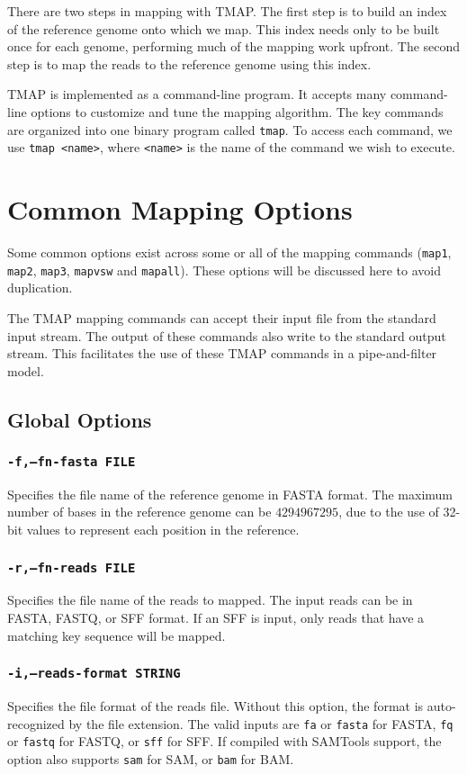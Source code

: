 \documentclass[a4paper,12pt]{book}
\newcommand{\TT}[1]{{\tt #1}} %
\begin{document}
There are two steps in mapping with TMAP.
The first step is to build an index of the reference genome onto which we map.
This index needs only to be built once for each genome, performing much of the mapping work upfront.
The second step is to map the reads to the reference genome using this index.

TMAP is implemented as a command-line program.
It accepts many command-line options to customize and tune the mapping algorithm.
The key commands are organized into one binary program called \TT{tmap}.
To access each command, we use \TT{tmap <name>}, where \TT{<name>} is the name of the command we wish to execute.

\section{Common Mapping Options}
\label{sec:commonoptions}
Some common options exist across some or all of the mapping commands (\TT{map1}, \TT{map2}, \TT{map3}, \TT{mapvsw} and \TT{mapall}). 
These options will be discussed here to avoid duplication.

The TMAP mapping commands can accept their input file from the standard input stream.
The output of these commands also write to the standard output stream.
This facilitates the use of these TMAP commands in a pipe-and-filter model.

\subsection{Global Options}
\subsubsection{\TT{-f,--fn-fasta FILE}}
Specifies the file name of the reference genome in FASTA format.
The maximum number of bases in the reference genome can be $4294967295$, due to the use of 32-bit values to represent each position in the reference.

\subsubsection{\TT{-r,--fn-reads FILE}}
Specifies the file name of the reads to mapped.
The input reads can be in FASTA, FASTQ, or SFF format.
If an SFF is input, only reads that have a matching key sequence will be mapped.

\subsubsection{\TT{-i,--reads-format STRING}}
Specifies the file format of the reads file.
Without this option, the format is auto-recognized by the file extension.
The valid inputs are \TT{fa} or \TT{fasta} for FASTA, \TT {fq} or \TT{fastq} for FASTQ, or \TT{sff} for SFF.
If compiled with SAMTools support, the option also supports \TT{sam} for SAM, or \TT{bam} for BAM.
\end{document}
